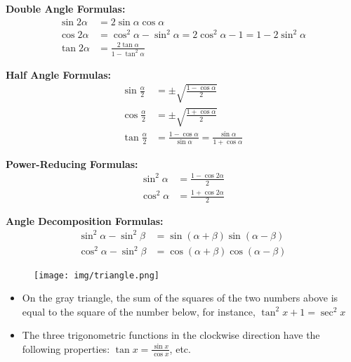 \documentclass[11pt]{../../TexTemplate/elegantbook}
\begin{document}
\textbf{Double Angle Formulas:}
\begin{align*}
\sin 2\alpha &= 2\sin\alpha \cos\alpha \\
\cos 2\alpha &= \cos^2\alpha - \sin^2\alpha = 2\cos^2\alpha - 1 = 1 - 2\sin^2\alpha \\
\tan 2\alpha &= \frac{2\tan\alpha}{1 - \tan^2\alpha}
\end{align*}

\textbf{Half Angle Formulas:}
\begin{align*}
\sin \frac{\alpha}{2} &= \pm \sqrt{ \frac{1 - \cos\alpha}{2} } \\
\cos \frac{\alpha}{2} &= \pm \sqrt{ \frac{1 + \cos\alpha}{2} } \\
\tan \frac{\alpha}{2} &= \frac{1 - \cos\alpha}{\sin\alpha} = \frac{\sin\alpha}{1 + \cos\alpha}
\end{align*}

\textbf{Power-Reducing Formulas:}
\begin{align*}
\sin^2\alpha &= \frac{1 - \cos 2\alpha}{2} \\
\cos^2\alpha &= \frac{1 + \cos 2\alpha}{2}
\end{align*}

\textbf{Angle Decomposition Formulas:}
\begin{align*}
\sin^2\alpha - \sin^2\beta &= \sin(\alpha + \beta) \sin(\alpha - \beta) \\
\cos^2\alpha - \sin^2\beta &= \cos(\alpha + \beta) \cos(\alpha - \beta)
\end{align*}

\begin{figure}[h]
    \centering
    \texttt{[image: img/triangle.png]}
\end{figure}

\begin{remark}
    \begin{itemize}
        \item On the gray triangle, the sum of the squares of the two numbers above is equal to the square of the number below,
            for instance, \(\tan^{2} x + 1 = \sec^{2}x\)
        \item The three trigonometric functions in the clockwise direction have the following properties: 
            $\tan x = \frac{\sin x}{\cos x}$, etc.
    \end{itemize}
\end{remark}
\end{document}
